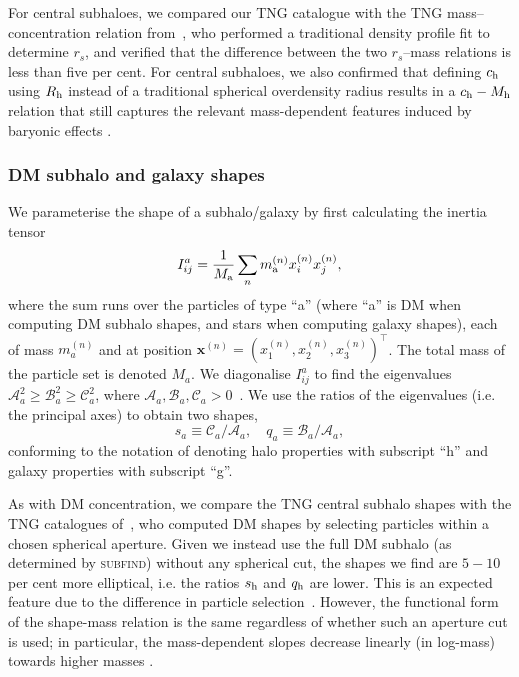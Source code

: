 \documentclass[useAMS,usenatbib]{mnras}
\begin{document}
For central subhaloes, we compared our TNG catalogue with the TNG mass--concentration relation from~\citet*{Anbajagane_2022}, who performed a traditional density profile fit to determine $r_s$, and verified that the difference between the two $r_s$--mass relations is less than five per cent. For central subhaloes, we also confirmed that defining $c_{\rm h}$ using $R_{\rm h}$ instead of a traditional spherical overdensity radius results in a $c_{\rm h} - M_{\rm h}$ relation that still captures the relevant mass-dependent features induced by baryonic effects \citep*[see ``wiggle'' features in][Figure 3]{Anbajagane_2022}.

\subsubsection{\Acl{DM} subhalo and galaxy shapes}

We parameterise the shape of a subhalo/galaxy by first calculating the inertia tensor
\begin{equation}
    \label{eq:inertia tensor}
    I^a_{ij} = \frac{1}{M_{\rm a}} \sum_n m_{\rm a}^{\left( n \right)} x_i^{\left( n \right)}x_j^{\left( n \right)},
\end{equation}
where the sum runs over the particles of type ``a'' (where ``a'' is \ac{DM} when computing \ac{DM} subhalo shapes, and stars when computing galaxy shapes), each of mass $m_a^{\left( n \right)}$ and at position $\bm{x}^{\left( n \right)} = \left(x^{\left(n\right)}_1, x^{\left( n \right)}_2, x^{\left( n \right)}_3 \right)^\intercal$. The total mass of the particle set is denoted $M_a$. We diagonalise $I^a_{ij}$ to find the eigenvalues $\mathcal{A}_a^2 \geq \mathcal{B}_a^2 \geq \mathcal{C}_a^2$, where $\mathcal{A}_a,\mathcal{B}_a,\mathcal{C}_a > 0$~\citep{Chisari_2015}. We use the ratios of the eigenvalues (i.e. the principal axes) to obtain two shapes,
\begin{equation}
    s_a \equiv \mathcal{C}_a/\mathcal{A}_a, \quad q_a \equiv \mathcal{B}_a/\mathcal{A}_a,
\end{equation}
conforming to the notation of denoting halo properties with subscript ``h'' and galaxy properties with subscript ``g''.

As with \ac{DM} concentration, we compare the TNG central subhalo shapes with the TNG catalogues of~\citet*{Anbajagane_2022}, who computed \ac{DM} shapes by selecting particles within a chosen spherical aperture. Given we instead use the full \ac{DM} subhalo (as determined by \textsc{subfind}) without any spherical cut, the shapes we find are $5-10$ per cent more elliptical, i.e. the ratios $s_{\rm h}$ and $q_{\rm h}$ are lower. This is an expected feature due to the difference in particle selection~\citep{Zemp2011Shapes}. However, the functional form of the shape-mass relation is the
same regardless of whether such an aperture cut is used; in particular, the mass-dependent slopes decrease linearly (in log-mass) towards higher masses \citep*[see][Figure 5]{Anbajagane_2022}.
\end{document}

